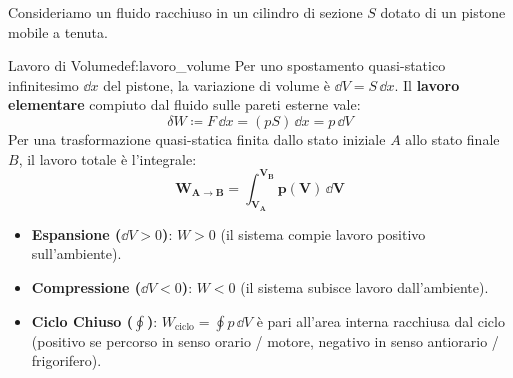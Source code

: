 Consideriamo un fluido racchiuso in un cilindro di sezione $S$ dotato di un pistone mobile a tenuta.

\begin{definizione}{Lavoro di Volume}{def:lavoro_volume}
Per uno spostamento quasi-statico infinitesimo $\dd x$ del pistone, la variazione di volume è $\dd V = S\,\dd x$. Il \textbf{lavoro elementare} compiuto dal fluido sulle pareti esterne vale:
\begin{equation}
    \delta W \coloneqq F\,\dd x = (p S)\,\dd x = p\,\dd V
    \label{eq:lavoro_termodinamico_elementare}
\end{equation}
Per una trasformazione quasi-statica finita dallo stato iniziale $A$ allo stato finale $B$, il lavoro totale è l'integrale:
\begin{equation}
    \mathbf{W_{A\to B} = \int_{V_A}^{V_B} p(V)\,\dd V}
    \label{eq:lavoro_clapeyron}
\end{equation}
\end{definizione}

\begin{center}
\end{center}

\begin{itemize}
    \item \textbf{Espansione ($\dd V > 0$)}: $W > 0$ (il sistema compie lavoro positivo sull'ambiente).
    \item \textbf{Compressione ($\dd V < 0$)}: $W < 0$ (il sistema subisce lavoro dall'ambiente).
    \item \textbf{Ciclo Chiuso ($\oint$)}: $W_{\text{ciclo}} = \oint p\,\dd V$ è pari all'area interna racchiusa dal ciclo (positivo se percorso in senso orario / motore, negativo in senso antiorario / frigorifero).
\end{itemize}


